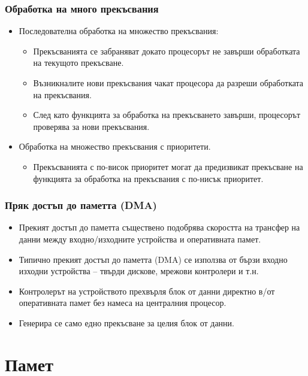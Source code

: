\documentclass[ignorenonframetext, hyperref=unicode]{beamer}
\begin{document}
\begin{frame}
\frametitle{Обработка на много прекъсвания}
\begin{itemize}
\item Последователна обработка на множество прекъсвания:
\begin{itemize}
  \item Прекъсванията се забраняват докато процесорът не завърши обработката на
  текущото прекъсване.
  \item Възникналите нови прекъсвания чакат процесора да разреши обработката на
  прекъсвания.
  \item След като функцията за обработка на прекъсването завърши, процесорът
  проверява за нови прекъсвания.
\end{itemize}
\item Обработка на множество прекъсвания с приоритети.
\begin{itemize}
  \item Прекъсванията с по-висок приоритет могат да предизвикат прекъсване на
  функцията за обработка на прекъсвания с по-нисък приоритет.
\end{itemize}
\end{itemize}
\end{frame}

\begin{frame}
\frametitle{Пряк достъп до паметта (DMA)}
\begin{itemize}
\item Прекият достъп до паметта съществено подобрява скоростта на трансфер на
данни между входно/изходните устройства и оперативната памет.
\item Типично прекият достъп до паметта (DMA) се използва от бързи входно
изходни устройства -- твърди дискове, мрежови контролери и т.н.
\item Контролерът на устройството прехвърля блок от данни директно в/от оперативната
памет без намеса на централния процесор.
\item Генерира се само едно прекъсване за целия блок от данни.
\end{itemize}
\end{frame}

\section{Памет}
\end{document}
